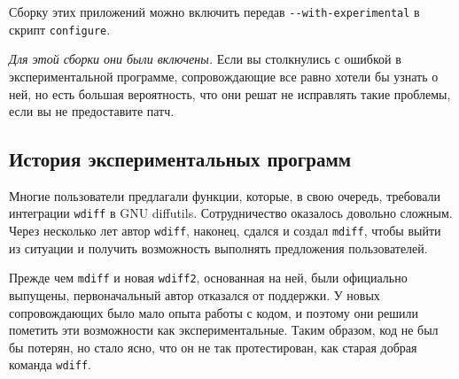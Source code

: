 Сборку этих приложений можно включить передав
\texttt{-\/-with-experimental} в скрипт \texttt{configure}.

\emph{Для этой сборки они были включены.} Если вы столкнулись с ошибкой
в \hspace{0pt}\hspace{0pt}экспериментальной программе, сопровождающие
все равно хотели бы узнать о ней, но есть большая вероятность, что они
решат не исправлять такие проблемы, если вы не предоставите патч.

\hypertarget{_0418_0441_0442_043e_0440_0438_044f-_044d_043a_0441_043f_0435_0440_0438_043c_0435_043d_0442_0430_043b_044c_043d_044b_0445-_0438_043d_0441_0442_0440_0443_043c_0435_043d_0442_043e_0432}{%
\subsection{История экспериментальных
программ}\label{_0418_0441_0442_043e_0440_0438_044f-_044d_043a_0441_043f_0435_0440_0438_043c_0435_043d_0442_0430_043b_044c_043d_044b_0445-_0438_043d_0441_0442_0440_0443_043c_0435_043d_0442_043e_0432}}

Многие пользователи предлагали функции, которые, в свою очередь,
требовали интеграции \texttt{wdiff} в GNU diffutils. Сотрудничество
оказалось довольно сложным. Через несколько лет автор \texttt{wdiff},
наконец, сдался и создал \texttt{mdiff}, чтобы выйти из ситуации и
получить возможность выполнять предложения пользователей.

Прежде чем \texttt{mdiff} и новая \texttt{wdiff2}, основанная на ней,
были официально выпущены, первоначальный автор отказался от поддержки. У
новых сопровождающих было мало опыта работы с кодом, и поэтому они
решили пометить эти возможности как экспериментальные. Таким образом,
код не был бы потерян, но стало ясно, что он не так протестирован, как
старая добрая команда \texttt{wdiff}.
